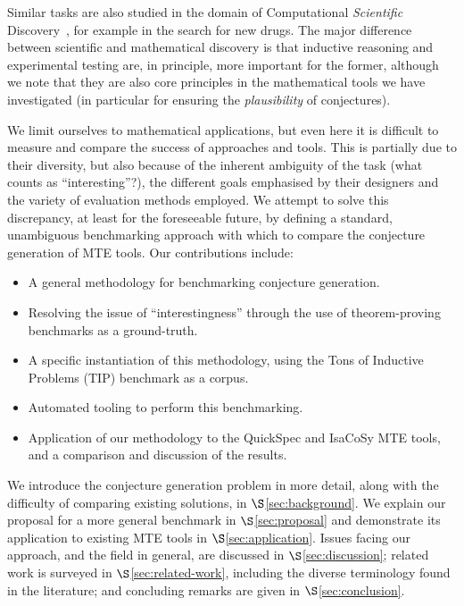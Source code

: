 Similar tasks are also studied in the domain of Computational \emph{Scientific}
Discovery~\cite{king2004functional,Williams20141289,schmidt2009distilling}, for
example in the search for new drugs. The major difference between scientific and
mathematical discovery is that inductive reasoning and experimental testing are,
in principle, more important for the former, although we note that they are also
core principles in the mathematical tools we have investigated (in particular
for ensuring the \emph{plausibility} of conjectures).

We limit ourselves to mathematical applications, but even here it is difficult
to measure and compare the success of approaches and tools. This is partially
due to their diversity, but also because of the inherent ambiguity of the task
(what counts as ``interesting''?), the different goals emphasised by their
designers and the variety of evaluation methods employed. We attempt to solve
this discrepancy, at least for the foreseeable future, by defining a standard,
unambiguous benchmarking approach with which to compare the conjecture
generation of MTE tools. Our contributions include:

\begin{itemize}
\item A general methodology for benchmarking conjecture generation.
\item Resolving the issue of ``interestingness'' through the use of
  theorem-proving benchmarks as a ground-truth.
\item A specific instantiation of this methodology, using the Tons of Inductive
  Problems (TIP) benchmark as a corpus.
\item Automated tooling to perform this benchmarking.
\item Application of our methodology to the QuickSpec and IsaCoSy MTE tools,
  and a comparison and discussion of the results.
\end{itemize}

We introduce the conjecture generation problem in more detail, along with the
difficulty of comparing existing solutions, in $\S$\ref{sec:background}. We
explain our proposal for a more general benchmark in $\S$\ref{sec:proposal} and
demonstrate its application to existing MTE tools in $\S$\ref{sec:application}.
Issues facing our approach, and the field in general, are discussed in
$\S$\ref{sec:discussion}; related work is surveyed in
$\S$\ref{sec:related-work}, including the diverse terminology found in the
literature; and concluding remarks are given in $\S$\ref{sec:conclusion}.

